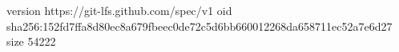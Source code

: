 version https://git-lfs.github.com/spec/v1
oid sha256:152fd7ffa8d80ec8a679fbeec0de72c5d6bb660012268da658711ec52a7e6d27
size 54222
